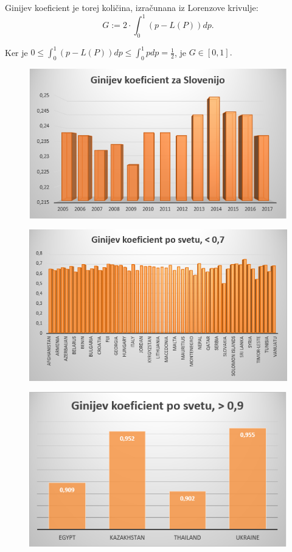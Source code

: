 \documentclass[a4paper,12 pt]{article}
\begin{document}
Ginijev koeficient je torej količina, izračunana iz Lorenzove krivulje: 
$$G := 2 \cdot \int_{0}^{1} (p - L(P)) dp. $$

Ker je $0 \leq \int_{0}^{1} (p - L(P)) dp \leq \int_{0}^{1} p dp = \frac{1}{2}$, je $G \in [0, 1].$

\begin{figure}
\includegraphics[width= \linewidth]{./slike/gini-slo.PNG}
\end{figure}

\begin{figure}
\includegraphics[width= \linewidth]{./slike/gini-manj-07.PNG}
\end{figure}

\begin{figure}
\includegraphics[width= \linewidth]{./slike/gini-vec-09.PNG}
\end{figure}
\end{document}
